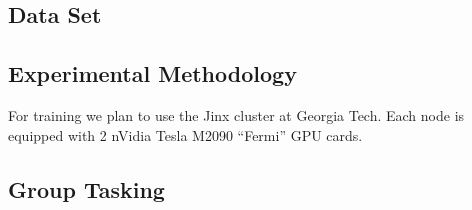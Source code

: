 \subsection{Data Set}
\subsection{Experimental Methodology}
\TODO{\dots}
For training we plan to use the Jinx cluster at Georgia Tech. Each node is equipped with 2 nVidia Tesla M2090 ``Fermi'' GPU cards.
\subsection{Group Tasking}
\TODO{\dots}

